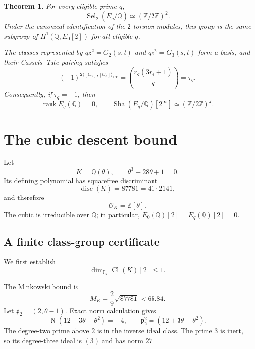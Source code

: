 \documentclass[11pt]{article}
\newtheorem{theorem}{Theorem}
\newcommand{\Q}{\mathbb Q}
\newcommand{\F}{\mathbb F}
\newcommand{\Z}{\mathbb Z}
\newcommand{\Sha}{\mathop{\mathrm{Sha}}}
\newcommand{\Sel}{\operatorname{Sel}}
\newcommand{\Cl}{\operatorname{Cl}}
\newcommand{\Nm}{\operatorname{N}}
\newcommand{\CT}{\mathrm{CT}}
\begin{document}
\begin{theorem}\label{main}
For every eligible prime $q$,
\[
\Sel_2(E_q/\Q)\simeq(\Z/2\Z)^2.
\]
Under the canonical identification of the $2$-torsion modules,
this group is the same subgroup of $H^1(\Q,E_0[2])$
for all eligible $q$.

The classes represented by $qz^2=G_2(s,t)$ and
$qz^2=G_3(s,t)$ form a basis, and their Cassels--Tate
pairing satisfies
\begin{equation}\label{pairing}
(-1)^{2\langle[G_2],[G_3]\rangle_{\CT}}
=\left(\frac{r_q(3r_q+1)}q\right)=\tau_q.
\end{equation}
Consequently, if $\tau_q=-1$, then
\[
\operatorname{rank}E_q(\Q)=0,\qquad
\Sha(E_q/\Q)[2^\infty]\simeq(\Z/2\Z)^2.
\]
\end{theorem}

\section{The cubic descent bound}

Let
\[
K=\Q(\theta),\qquad \theta^3-28\theta+1=0.
\]
Its defining polynomial has squarefree discriminant
\[
\operatorname{disc}(K)=87781=41\cdot2141,
\]
and therefore
\[
\mathcal O_K=\Z[\theta].
\]
The cubic is irreducible over $\Q$; in particular,
$E_0(\Q)[2]=E_q(\Q)[2]=0$.

\subsection{A finite class-group certificate}

We first establish
\begin{equation}\label{clbound}
\dim_{\F_2}\Cl(K)[2]\le1.
\end{equation}

The Minkowski bound is
\[
M_K=\frac{2}{9}\sqrt{87781}<65.84.
\]
Let $\mathfrak p_2=(2,\theta-1)$.
Exact norm calculation gives
\[
\Nm(12+3\theta-\theta^2)=-4,\qquad
\mathfrak p_2^2=(12+3\theta-\theta^2).
\]
The degree-two prime above $2$ is in the inverse ideal
class. The prime $3$ is inert, so its degree-three ideal
is $(3)$ and has norm $27$.
\end{document}
